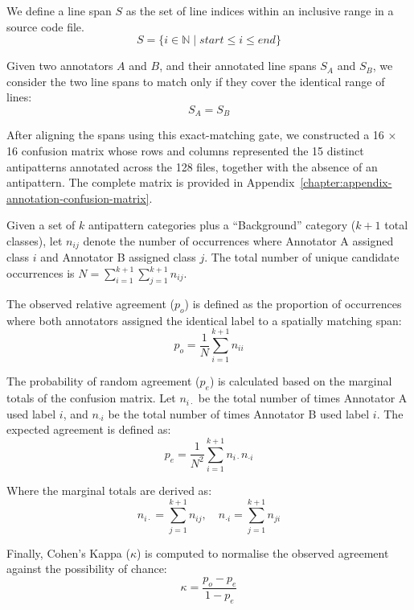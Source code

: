 We define a line span \(S\) as the set of line indices within an inclusive range in a source code file.
\begin{equation}
S = \{i \in \mathbb{N} \mid start \le i \le end\}
\end{equation}

Given two annotators \(A\) and \(B\), and their annotated line spans \(S_A\) and \(S_B\), we consider the two line spans to match only if they cover the identical range of lines:
\begin{equation}
S_A = S_B
\end{equation}

After aligning the spans using this exact-matching gate, we constructed a \num{16} × \num{16} confusion matrix whose rows and columns represented the \num{15} distinct antipatterns annotated across the \num{128} files, together with the absence of an antipattern. The complete matrix is provided in Appendix~\ref{chapter:appendix-annotation-confusion-matrix}.

Given a set of \(k\) antipattern categories plus a “Background” category (\(k+1\) total classes), let \(n_{ij}\) denote the number of occurrences where Annotator A assigned class \(i\) and Annotator B assigned class \(j\). The total number of unique candidate occurrences is \(N = \sum_{i=1}^{k+1} \sum_{j=1}^{k+1} n_{ij}\).

The observed relative agreement (\(p_o\)) is defined as the proportion of occurrences where both annotators assigned the identical label to a spatially matching span:
\begin{equation}
p_o = \frac{1}{N} \sum_{i=1}^{k+1} n_{ii}
\end{equation}

The probability of random agreement (\(p_e\)) is calculated based on the marginal totals of the confusion matrix. Let \(n_{i \cdot}\) be the total number of times Annotator A used label \(i\), and \(n_{\cdot i}\) be the total number of times Annotator B used label \(i\). The expected agreement is defined as:
\begin{equation}
p_e = \frac{1}{N^2} \sum_{i=1}^{k+1} n_{i \cdot} n_{\cdot i}
\end{equation}

Where the marginal totals are derived as:
\begin{equation}
n_{i \cdot} = \sum_{j=1}^{k+1} n_{ij}, \quad n_{\cdot i} = \sum_{j=1}^{k+1} n_{ji}
\end{equation}

Finally, Cohen’s Kappa (\(\kappa\)) is computed to normalise the observed agreement against the possibility of chance:
\begin{equation}
\kappa = \frac{p_o - p_e}{1 - p_e}
\end{equation}


